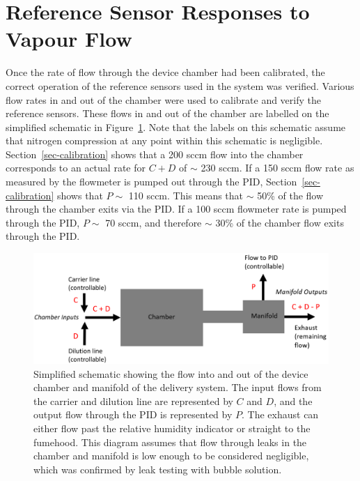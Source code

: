 \documentclass[
  a4paper,
]{scrbook}
\begin{document}
\hypertarget{sec-responses-to-vapour}{%
\section{Reference Sensor Responses to Vapour
Flow}\label{sec-responses-to-vapour}}

Once the rate of flow through the device chamber had been calibrated,
the correct operation of the reference sensors used in the system was
verified. Various flow rates in and out of the chamber were used to
calibrate and verify the reference sensors. These flows in and out of
the chamber are labelled on the simplified schematic in
Figure~\ref{fig-chamber-schematic}. Note that the labels on this
schematic assume that nitrogen compression at any point within this
schematic is negligible. Section~\ref{sec-calibration} shows that a 200
sccm flow into the chamber corresponds to an actual rate for \(C + D\)
of \(\sim\) 230 sccm. If a 150 sccm flow rate as measured by the
flowmeter is pumped out through the PID, Section~\ref{sec-calibration}
shows that \(P \sim\) 110 sccm. This means that \(\sim\) 50\% of the
flow through the chamber exits via the PID. If a 100 sccm flowmeter rate
is pumped through the PID, \(P \sim\) 70 sccm, and therefore \(\sim\)
30\% of the chamber flow exits through the PID.

\begin{figure}

{\centering \includegraphics[width=1\textwidth,height=\textheight]{figures/ch9/chamber-manifold-v2.png}

}

\caption[Simplified schematic showing the flow into and out of the
device chamber and manifold of the delivery
system.]{\label{fig-chamber-schematic}Simplified schematic showing the
flow into and out of the device chamber and manifold of the delivery
system. The input flows from the carrier and dilution line are
represented by \(C\) and \(D\), and the output flow through the PID is
represented by \(P\). The exhaust can either flow past the relative
humidity indicator or straight to the fumehood. This diagram assumes
that flow through leaks in the chamber and manifold is low enough to be
considered negligible, which was confirmed by leak testing with bubble
solution.}

\end{figure}
\end{document}
